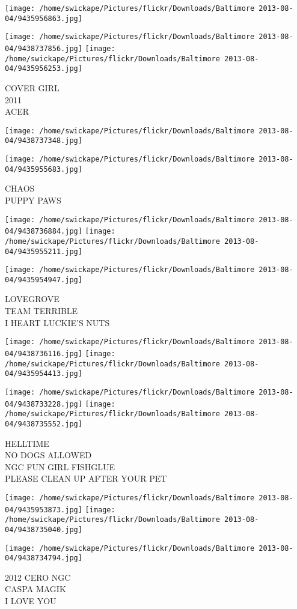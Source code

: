 \documentclass[10pt,letterpaper]{article}
\begin{document}
\texttt{[image: /home/swickape/Pictures/flickr/Downloads/Baltimore 2013-08-04/9435956863.jpg]}

\vspace{0.25in}
\texttt{[image: /home/swickape/Pictures/flickr/Downloads/Baltimore 2013-08-04/9438737856.jpg]}
\texttt{[image: /home/swickape/Pictures/flickr/Downloads/Baltimore 2013-08-04/9435956253.jpg]}

COVER GIRL\\
2011\\
ACER
\pagebreak

\texttt{[image: /home/swickape/Pictures/flickr/Downloads/Baltimore 2013-08-04/9438737348.jpg]}

\vspace{0.25in}
\texttt{[image: /home/swickape/Pictures/flickr/Downloads/Baltimore 2013-08-04/9435955683.jpg]}

CHAOS\\
PUPPY PAWS
\pagebreak

\texttt{[image: /home/swickape/Pictures/flickr/Downloads/Baltimore 2013-08-04/9438736884.jpg]}
\texttt{[image: /home/swickape/Pictures/flickr/Downloads/Baltimore 2013-08-04/9435955211.jpg]}

\vspace{0.25in}
\texttt{[image: /home/swickape/Pictures/flickr/Downloads/Baltimore 2013-08-04/9435954947.jpg]}

LOVEGROVE\\
TEAM TERRIBLE\\
I HEART LUCKIE'S NUTS
\pagebreak

\texttt{[image: /home/swickape/Pictures/flickr/Downloads/Baltimore 2013-08-04/9438736116.jpg]}
\texttt{[image: /home/swickape/Pictures/flickr/Downloads/Baltimore 2013-08-04/9435954413.jpg]}

\texttt{[image: /home/swickape/Pictures/flickr/Downloads/Baltimore 2013-08-04/9438733228.jpg]}
\texttt{[image: /home/swickape/Pictures/flickr/Downloads/Baltimore 2013-08-04/9438735552.jpg]}

HELLTIME\\
NO DOGS ALLOWED\\
NGC FUN GIRL FISHGLUE\\
PLEASE CLEAN UP AFTER YOUR PET
\pagebreak

\texttt{[image: /home/swickape/Pictures/flickr/Downloads/Baltimore 2013-08-04/9435953873.jpg]}
\texttt{[image: /home/swickape/Pictures/flickr/Downloads/Baltimore 2013-08-04/9438735040.jpg]}

\vspace{0.25in}
\texttt{[image: /home/swickape/Pictures/flickr/Downloads/Baltimore 2013-08-04/9438734794.jpg]}

2012 CERO NGC\\
CASPA MAGIK\\
I LOVE YOU
\pagebreak
\end{document}
